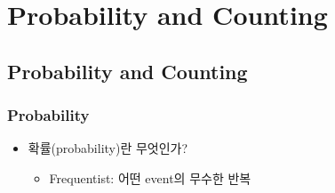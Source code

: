 \section{Probability and Counting}

\subsection{Probability and Counting}

\subsubsection*{Probability}
\begin{itemize}
    \item 확률(probability)란 무엇인가?
    \begin{itemize}
        \item Frequentist: 어떤 event의 무수한 반복
    \end{itemize}
\end{itemize}
